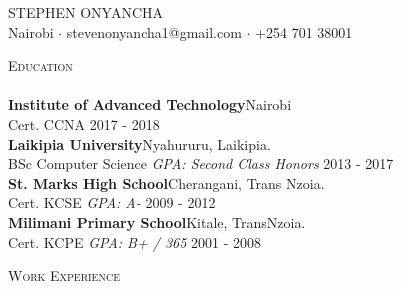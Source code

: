 \documentclass[a4paper]{article}
\newcommand{\lineunder} {
    \vspace*{-8pt} \\
    \hspace*{-18pt} \hrulefill \\
}
\newcommand{\header} [1] {
    {\hspace*{-18pt}\vspace*{6pt} \textsc{#1}}
    \vspace*{-6pt} \lineunder
}
\begin{document}
\vspace*{-40pt}

    

\vspace*{-10pt}
\begin{center}
	{\Huge \scshape {STEPHEN ONYANCHA}}\\
	Nairobi $\cdot$ stevenonyancha1@gmail.com $\cdot$ +254 701 38001 \\ %
\end{center}

\header{Education}

\textbf{Institute of Advanced Technology}\hfill Nairobi\\
Cert. CCNA \hfill 2017 - 2018\\
\vspace{2mm}
\textbf{Laikipia University}\hfill Nyahururu, Laikipia.\\
BSc Computer Science \textit{GPA: Second Class Honors} \hfill 2013 - 2017\\
\vspace{2mm}
\textbf{St. Mark\textquotesingle{}s High School}\hfill Cherangani, Trans Nzoia.\\
Cert. KCSE \textit{GPA: A-} \hfill 2009 - 2012\\
\vspace{2mm}
\textbf{Milimani Primary School}\hfill Kitale, TransNzoia.\\
Cert. KCPE \textit{GPA: B+ / 365} \hfill 2001 - 2008\\
\vspace{2mm}


\header{Work Experience}
\vspace{1mm}
\end{document}
